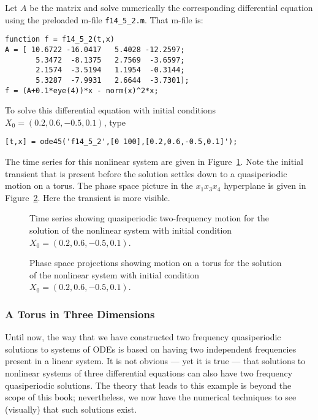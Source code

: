 \documentclass{ximera}
\begin{document}
Let $A$ be the matrix  and solve numerically the corresponding
differential equation  using the preloaded m-file 
{\tt f14\_5\_2.m}. That m-file is:
\begin{verbatim}
function f = f14_5_2(t,x)
A = [ 10.6722 -16.0417   5.4028 -12.2597;
       5.3472  -8.1375   2.7569  -3.6597;
       2.1574  -3.5194   1.1954  -0.3144;
       5.3287  -7.9931   2.6644  -3.7301];
f = (A+0.1*eye(4))*x - norm(x)^2*x;
\end{verbatim}
To solve this differential equation with initial conditions 
$X_0=(0.2,0.6,-0.5,0.1)$, type
\begin{verbatim}
[t,x] = ode45('f14_5_2',[0 100],[0.2,0.6,-0.5,0.1]');
\end{verbatim}

The time series for this nonlinear system are given in Figure~\ref{F:tornlts}.
Note the initial transient that is present before the solution settles 
down to a quasiperiodic motion on a torus.
  The phase space picture in the $x_1x_3x_4$ hyperplane is given 
in Figure~\ref{F:tornlps}.  Here the transient is more visible.
 
\begin{figure}[htb]
   \centerline{%
   }
   \caption{Time series showing quasiperiodic two-frequency motion for the 
	solution of the nonlinear system \protect{} with 
	initial condition $X_0=(0.2,0.6,-0.5,0.1)$.}
   \label{F:tornlts}
\end{figure}

\begin{figure}[htb]
   \centerline{%
   }
   \caption{Phase space projections showing motion on a torus for the 
	solution of the nonlinear system \protect{} with 
	initial condition $X_0=(0.2,0.6,-0.5,0.1)$.}
   \label{F:tornlps}
\end{figure}



\subsubsection*{A Torus in Three Dimensions}

Until now, the way that we have constructed two frequency quasiperiodic 
solutions to systems of ODEs is based on having two independent frequencies 
present in a linear system.  It is not obvious --- yet it is true --- 
that solutions to nonlinear systems of three differential equations 
can also have two frequency quasiperiodic 
solutions.  The theory that 
leads to this example is beyond the scope of this book; nevertheless, we
now have the numerical techniques to see (visually) that such solutions 
exist.
\end{document}

